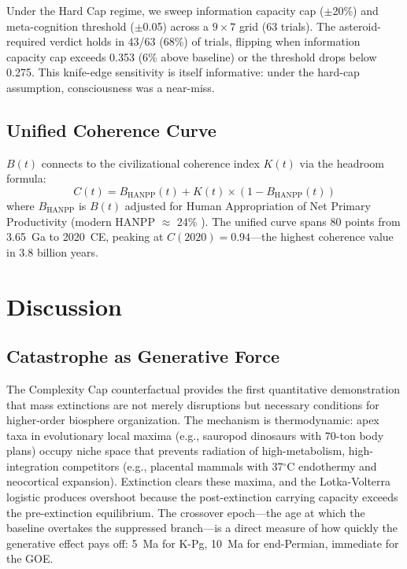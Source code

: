 \documentclass[10pt,letterpaper]{article}
\newcommand{\bt}{$B(t)$}
\newcommand{\kt}{$K(t)$}
\begin{document}
Under the Hard Cap regime, we sweep information capacity cap ($\pm$20\%)
and meta-cognition threshold ($\pm$0.05) across a $9 \times 7$ grid
(63 trials). The asteroid-required verdict holds in 43/63 (68\%) of trials,
flipping when information capacity cap exceeds 0.353 (6\% above baseline)
or the threshold drops below 0.275. This knife-edge sensitivity is itself
informative: under the hard-cap assumption, consciousness was a near-miss.

\subsection*{Unified Coherence Curve}

\bt{} connects to the civilizational coherence index \kt{} \cite{stoltz2026kt}
via the headroom formula:
\begin{equation}
C(t) = B_\text{HANPP}(t) + K(t) \times (1 - B_\text{HANPP}(t))
\end{equation}
where $B_\text{HANPP}$ is \bt{} adjusted for Human Appropriation of Net Primary
Productivity (modern HANPP $\approx$ 24\% \cite{haberl2007}). The unified curve
spans 80 points from 3.65~Ga to 2020~CE, peaking at $C(2020) = 0.94$---the
highest coherence value in 3.8 billion years.

\section*{Discussion}

\subsection*{Catastrophe as Generative Force}

The Complexity Cap counterfactual provides the first quantitative demonstration
that mass extinctions are not merely disruptions but necessary conditions for
higher-order biosphere organization. The mechanism is thermodynamic: apex taxa
in evolutionary local maxima (e.g., sauropod dinosaurs with 70-ton body plans)
occupy niche space that prevents radiation of high-metabolism, high-integration
competitors (e.g., placental mammals with 37$^\circ$C endothermy and neocortical
expansion). Extinction clears these maxima, and the Lotka-Volterra logistic
produces overshoot because the post-extinction carrying capacity exceeds the
pre-extinction equilibrium. The crossover epoch---the age at which the baseline
overtakes the suppressed branch---is a direct measure of how quickly the
generative effect pays off: 5~Ma for K-Pg, 10~Ma for end-Permian, immediate
for the GOE.
\end{document}
